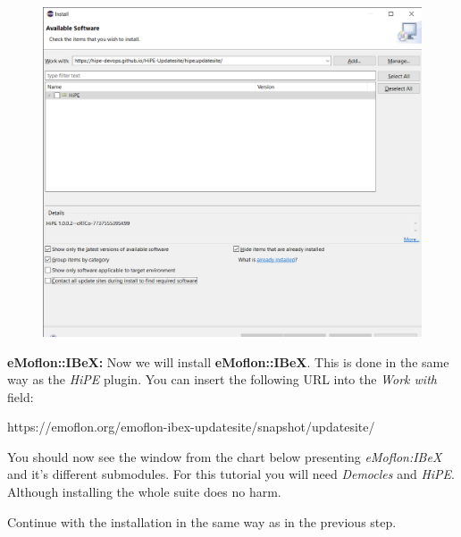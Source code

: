 \begin{figure}[h]
    \centering
    \includegraphics[scale=0.5]{pictures/eclipse_install_new_software_hipe.png}
    \caption{}
    \label{screenshot install new software hipe}
\end{figure}

\clearpage

\textbf{eMoflon::IBeX:}\newline\newline
Now we will install \textbf{eMoflon::IBeX}. This is done in the same way as the \textsf{\textit{HiPE}} plugin. You can insert the following URL into the \textsf{\textit{Work with}} field:\newline

\centering
{\color{blue}https://emoflon.org/emoflon-ibex-updatesite/snapshot/updatesite/\newline}


\raggedright
You should now see the window from the chart below presenting \textsf{\textit{eMoflon:IBeX}} and it's different submodules. For this tutorial you will need \textsf{\textit{Democles}} and \textsf{\textit{HiPE}}. Although installing the whole suite does no harm.

Continue with the installation in the same way as in the previous step.\newline

